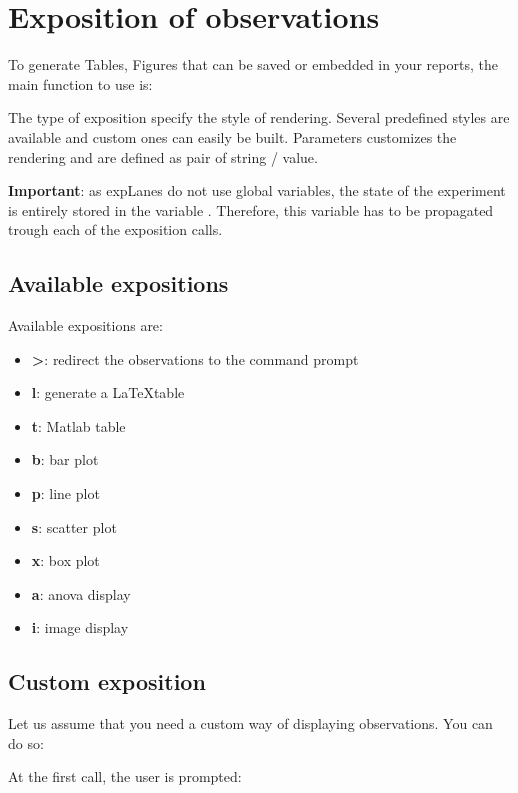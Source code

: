\documentclass[a4paper,fleqn]{tufte-handout}
\newcommand{\explanes}{\textsf{expLanes} }
\begin{document}
\section{Exposition of observations}

To generate Tables, Figures that can be saved or embedded in your reports, the main function to use is:


The type of exposition specify the style of rendering. Several predefined styles are available and custom ones can easily be built. Parameters customizes the rendering and are defined as pair of string / value.

\textbf{Important}: as \explanes do not use global variables, the state of the experiment is entirely stored in the variable . Therefore, this variable has to be propagated trough each of the exposition calls.

\subsection{Available expositions}

Available expositions are:
\begin{itemize}
\item \textbf{>}: redirect the observations to the command prompt
\item \textbf{l}: generate a \LaTeX table
\item \textbf{t}: Matlab table
\item \textbf{b}: bar plot
\item \textbf{p}: line plot
\item \textbf{s}: scatter plot
\item \textbf{x}: box plot
\item \textbf{a}: anova display
\item \textbf{i}: image display
\end{itemize}

\subsection{Custom exposition}

Let us assume that you need a custom way of displaying observations. You can do so:


At the first call, the user is prompted:
\end{document}
